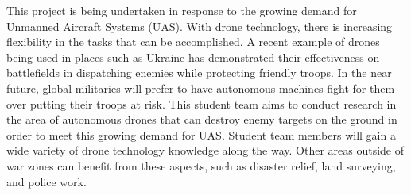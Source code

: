 
This project is being undertaken in response to the growing demand for Unmanned Aircraft Systems (UAS). With drone technology, there is increasing flexibility in the tasks that can be accomplished. A recent example of drones being used in places such as Ukraine has demonstrated their effectiveness on battlefields in dispatching enemies while protecting friendly troops. In the near future, global militaries will prefer to have autonomous machines fight for them over putting their troops at risk. This student team aims to conduct research in the area of autonomous drones that can destroy enemy targets on the ground in order to meet this growing demand for UAS. Student team members will gain a wide variety of drone technology knowledge along the way. Other areas outside of war zones can benefit from these aspects, such as disaster relief, land surveying, and police work.

